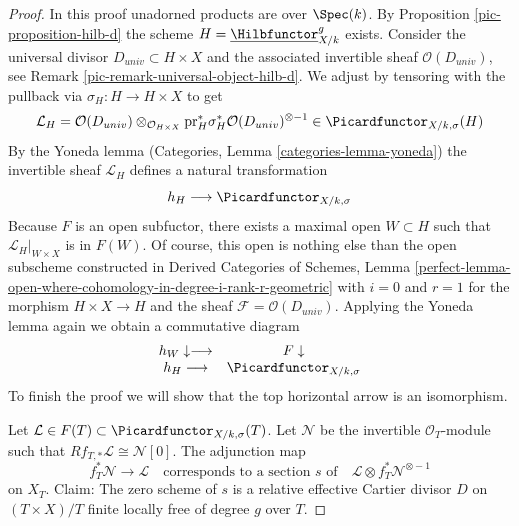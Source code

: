 \begin{proof}

In this proof unadorned products are over $\Spec(k)$.
By Proposition \ref{pic-proposition-hilb-d} the scheme
$H = \underline{\Hilbfunctor}^g_{X/k}$ exists.
Consider the universal divisor $D_{univ} \subset H \times X$
and the associated invertible sheaf $\mathcal{O}(D_{univ})$, see
Remark \ref{pic-remark-universal-object-hilb-d}.
We adjust by tensoring with the pullback via
$\sigma_H : H \to H \times X$ to get
$$
\mathcal{L}_H =
\mathcal{O}(D_{univ})
\otimes_{\mathcal{O}_{H \times X}}
\text{pr}_H^*\sigma_H^*\mathcal{O}(D_{univ})^{\otimes -1}
\in
\Picardfunctor_{X/k, \sigma}(H)
$$
By the Yoneda lemma (Categories, Lemma \ref{categories-lemma-yoneda})
the invertible sheaf $\mathcal{L}_H$ defines a natural transformation
$$
h_H \longrightarrow \Picardfunctor_{X/k, \sigma}
$$
Because $F$ is an open subfuctor, there exists a maximal open
$W \subset H$ such that $\mathcal{L}_H|_{W \times X}$ is in
$F(W)$. Of course, this open is nothing else than the
open subscheme constructed in
Derived Categories of Schemes, Lemma
\ref{perfect-lemma-open-where-cohomology-in-degree-i-rank-r-geometric}
with $i = 0$ and $r = 1$ for the morphism $H \times X \to H$ and the sheaf
$\mathcal{F} = \mathcal{O}(D_{univ})$. Applying the Yoneda lemma
again we obtain a commutative diagram
$$
\begin{array}{cc}h_W \downarrow\longrightarrow & F \downarrow \\ h_H \longrightarrow & \Picardfunctor_{X/k, \sigma}\end{array}
$$
To finish the proof we will show that the top horizontal arrow is an
isomorphism.

\medskip\noindent
Let $\mathcal{L} \in F(T) \subset \Picardfunctor_{X/k, \sigma}(T)$.
Let $\mathcal{N}$ be the invertible $\mathcal{O}_T$-module
such that $Rf_{T, *}\mathcal{L} \cong \mathcal{N}[0]$.
The adjunction map
$$
f_T^*\mathcal{N} \longrightarrow \mathcal{L}
\quad\text{corresponds to a section }s\text{ of}\quad
\mathcal{L} \otimes f_T^*\mathcal{N}^{\otimes -1}
$$
on $X_T$. Claim: The zero scheme of $s$ is a relative effective Cartier
divisor $D$ on $(T \times X)/T$ finite locally free of degree $g$ over $T$.


\end{proof}
